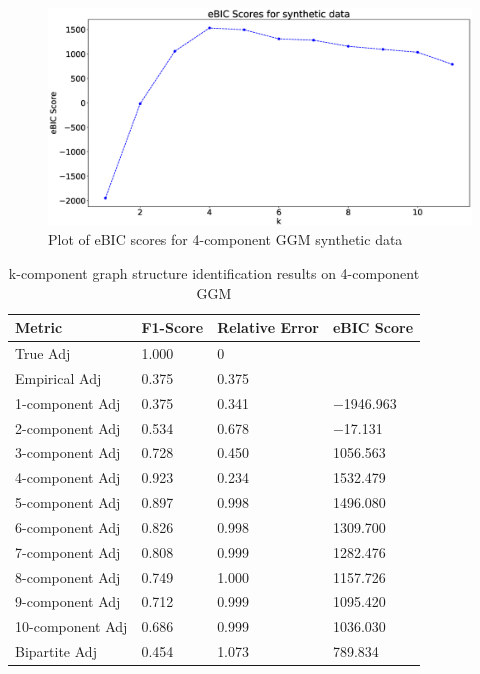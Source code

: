 \begin{center}
	\begin{figure}[htpb]
		\includegraphics[scale=0.32]{Pictures/4comp}
		\caption{Plot of eBIC scores for 4-component GGM synthetic data}
		\label{fig:kcomp-ebic}
	\end{figure}
\end{center}

\begin{table}[htpb]
	\caption{k-component graph structure identification results on 4-component GGM}
	\label{tab:kcomp-res}
	\centering
	\begin{tabular}{llll}
		\toprule
		Metric     &   F1-Score  & Relative Error & eBIC Score \\
		\midrule
		
		
		True Adj          & 1.000  & 0     &    \\
		Empirical Adj     & 0.375  & 0.375 &    \\
		1-component Adj   & 0.375  & 0.341 &  $-$1946.963	 \\
		2-component Adj   & 0.534  & 0.678 &  $-$17.131  \\
		3-component Adj   & 0.728  & 0.450 &  1056.563 \\
		4-component Adj   & 0.923  & 0.234 &  1532.479   \\
		5-component Adj   & 0.897  & 0.998 &  1496.080   \\
		6-component Adj   & 0.826  & 0.998 &  1309.700  \\
		7-component Adj   & 0.808  & 0.999 &  1282.476 \\
		8-component Adj   & 0.749  & 1.000 &  1157.726   \\
		9-component Adj   & 0.712  & 0.999 &  1095.420   \\
		10-component Adj  & 0.686  & 0.999 &  1036.030     \\
		Bipartite Adj     & 0.454  & 1.073 &  789.834   \\
		\bottomrule
	\end{tabular}
\end{table}

